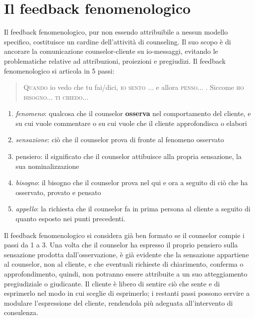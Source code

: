 \section{Il feedback fenomenologico}
\label{s:feedback}
Il feedback fenomenologico, pur non essendo attribuibile a nessun modello specifico, costituisce un cardine dell'attività di counseling. Il suo scopo è di ancorare la comunicazione counselor-cliente su io-messaggi, evitando le problematiche relative ad attribuzioni, proiezioni  e pregiudizi. Il feedback fenomenologico si articola in 5 passi:

\begin{quote}
\textsc{Quando} io vedo che tu fai/dici, \textsc{io sento }... e allora \textsc{penso}... . Siccome \textsc{ho bisogno}... \textsc{ti chiedo}...
\end{quote}
\begin{enumerate}
\item \emph{fenomeno}: qualcosa che il counselor \textbf{osserva} nel comportamento del cliente, e su cui vuole commentare o su cui vuole che il cliente approfondisca o elabori
\item \emph{sensazione}: ciò che il counselor prova di fronte al fenomeno osservato
\item pensiero: il significato che il counselor attibuisce alla propria sensazione, la sua nominalizzazione
\item \emph{bisogno}: il bisogno che il counselor prova nel qui e ora a seguito di ciò che ha osservato, provato e pensato
\item \emph{appello}: la richiesta che il counselor fa in prima persona al cliente a seguito di quanto esposto nei punti precedenti.
\end{enumerate} 

\noindent Il feedback fenomenologico si considera già ben formato se il counselor compie i passi da 1 a 3. Una volta che il counselor ha espresso il proprio pensiero sulla sensazione prodotta dall'osservazione, è già evidente che la sensazione appartiene al counselor, non al cliente, e che eventuali richieste di chiarimento, conferma o approfondimento, quindi, non potranno essere attribuite a un suo atteggiamento pregiudiziale o giudicante. Il cliente è libero di sentire ciò che sente e di esprimerlo nel modo in cui sceglie di esprimerlo; i restanti passi possono servire a modulare l'espressione del cliente, rendendola più adeguata all'intervento di consulenza. 